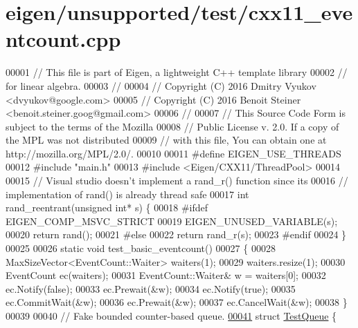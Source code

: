 \hypertarget{eigen_2unsupported_2test_2cxx11__eventcount_8cpp_source}{}\section{eigen/unsupported/test/cxx11\+\_\+eventcount.cpp}
\label{eigen_2unsupported_2test_2cxx11__eventcount_8cpp_source}

\begin{DoxyCode}
00001 \textcolor{comment}{// This file is part of Eigen, a lightweight C++ template library}
00002 \textcolor{comment}{// for linear algebra.}
00003 \textcolor{comment}{//}
00004 \textcolor{comment}{// Copyright (C) 2016 Dmitry Vyukov <dvyukov@google.com>}
00005 \textcolor{comment}{// Copyright (C) 2016 Benoit Steiner <benoit.steiner.goog@gmail.com>}
00006 \textcolor{comment}{//}
00007 \textcolor{comment}{// This Source Code Form is subject to the terms of the Mozilla}
00008 \textcolor{comment}{// Public License v. 2.0. If a copy of the MPL was not distributed}
00009 \textcolor{comment}{// with this file, You can obtain one at http://mozilla.org/MPL/2.0/.}
00010 
00011 \textcolor{preprocessor}{#define EIGEN\_USE\_THREADS}
00012 \textcolor{preprocessor}{#include "main.h"}
00013 \textcolor{preprocessor}{#include <Eigen/CXX11/ThreadPool>}
00014 
00015 \textcolor{comment}{// Visual studio doesn't implement a rand\_r() function since its}
00016 \textcolor{comment}{// implementation of rand() is already thread safe}
00017 \textcolor{keywordtype}{int} rand\_reentrant(\textcolor{keywordtype}{unsigned} \textcolor{keywordtype}{int}* s) \{
00018 \textcolor{preprocessor}{#ifdef EIGEN\_COMP\_MSVC\_STRICT}
00019   EIGEN\_UNUSED\_VARIABLE(s);
00020   \textcolor{keywordflow}{return} rand();
00021 \textcolor{preprocessor}{#else}
00022   \textcolor{keywordflow}{return} rand\_r(s);
00023 \textcolor{preprocessor}{#endif}
00024 \}
00025 
00026 \textcolor{keyword}{static} \textcolor{keywordtype}{void} test\_basic\_eventcount()
00027 \{
00028   MaxSizeVector<EventCount::Waiter> waiters(1);
00029   waiters.resize(1);
00030   EventCount ec(waiters);
00031   EventCount::Waiter& w = waiters[0];
00032   ec.Notify(\textcolor{keyword}{false});
00033   ec.Prewait(&w);
00034   ec.Notify(\textcolor{keyword}{true});
00035   ec.CommitWait(&w);
00036   ec.Prewait(&w);
00037   ec.CancelWait(&w);
00038 \}
00039 
00040 \textcolor{comment}{// Fake bounded counter-based queue.}
\hyperlink{struct_test_queue}{00041} \textcolor{keyword}{struct }\hyperlink{struct_test_queue}{TestQueue} \{

\end{DoxyCode}
